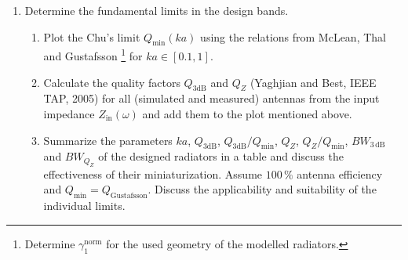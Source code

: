 \documentclass[11pt,a4paper]{article}
\begin{document}
\begin{enumerate}[label=\arabic*.]
        \item Determine the fundamental limits in the design bands.
        \begin{enumerate}[label=5.\arabic*]
            \item Plot the Chu's limit $Q_{\mathrm{min}}(ka)$ using the relations from McLean, Thal and Gustafsson%
                \footnote{Determine $\gamma_1^{\mathrm{norm}}$ for the used geometry of the modelled radiators.}
            for $ka \in [0.1,1]$.
            \item Calculate the quality factors $Q_{3\mathrm{dB}}$ and $Q_Z$ (Yaghjian and Best, IEEE TAP, 2005) for all (simulated and measured) antennas from the input impedance $Z_{\mathrm{in}}(\omega)$ and add them to the plot mentioned above.
            \item Summarize the parameters $ka$, $Q_{3\mathrm{dB}}$, $Q_{3\mathrm{dB}}/Q_{\mathrm{min}}$, $Q_Z$, $Q_Z/Q_{\mathrm{min}}$, $\mathit{BW}_{3\, \mathrm{dB}}$ and $\mathit{BW}_{Q_Z}$ of the designed radiators in a table and discuss the effectiveness of their miniaturization. Assume $100\, \%$ antenna efficiency and $Q_{\mathrm{min}} = Q_{\mathrm{Gustafsson}}$. Discuss the applicability and suitability of the individual limits.
        \end{enumerate}
    \end{enumerate}

\newpage
\end{document}
